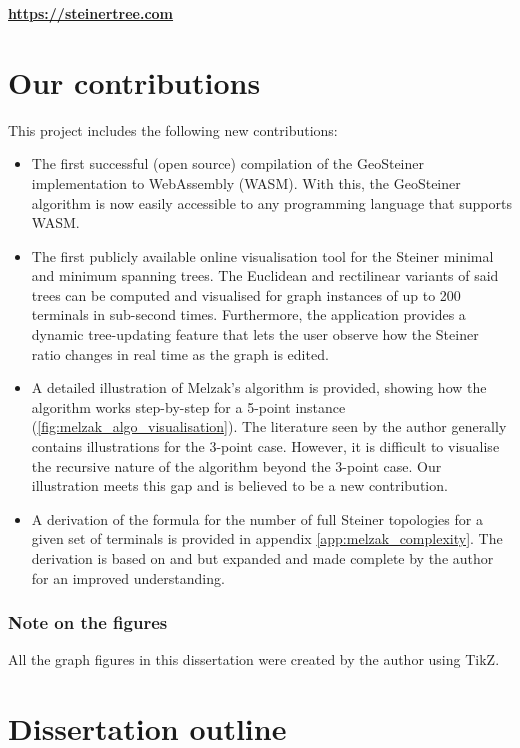 \documentclass{l4proj}
\begin{document}
\begin{tcolorbox}[title=Access the end product here, colback=gray!10, colframe=gray!80]
    \centering
    \Huge{\textbf{\url{https://steinertree.com}}}
\end{tcolorbox}

\section{Our contributions}
This project includes the following new contributions:
\begin{itemize}
    \item The first successful (open source) compilation of the GeoSteiner implementation to WebAssembly (WASM). With this, the GeoSteiner algorithm is now easily accessible to any programming language that supports WASM.
    \item The first publicly available online visualisation tool for the Steiner minimal and minimum spanning trees. The Euclidean and rectilinear variants of said trees can be computed and visualised for graph instances of up to 200 terminals in sub-second times. Furthermore, the application provides a dynamic tree-updating feature that lets the user observe how the Steiner ratio changes in real time as the graph is edited.
    \item A detailed illustration of Melzak's algorithm is provided, showing how the algorithm works step-by-step for a 5-point instance (\ref{fig:melzak_algo_visualisation}). The literature seen by the author generally contains illustrations for the 3-point case. However, it is difficult to visualise the recursive nature of the algorithm beyond the 3-point case. Our illustration meets this gap and is believed to be a new contribution.
    \item A derivation of the formula for the number of full Steiner topologies for a given set of terminals is provided in appendix \ref{app:melzak_complexity}. The derivation is based on \citet{geosteiner96} and \citet{Gilbert1968SteinerMT} but expanded and made complete by the author for an improved understanding.
\end{itemize}

\subsubsection{Note on the figures} All the graph figures in this dissertation were created by the author using TikZ.

\section{Dissertation outline}
\end{document}
